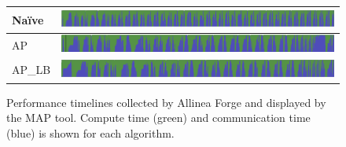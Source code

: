 \documentclass[11pt]{elsarticle}
\begin{document}
\begin{figure}[htp]
\centering
\label{my-label}
\begin{tabular}{|l|l|}
\hline
Na{\"i}ve & \includegraphics{naiveallinea} \\ \hline
AP & \includegraphics{apallinea} \\ \hline
AP\_LB & \includegraphics{aplballinea} \\ \hline
\end{tabular}
\caption{Performance timelines collected by Allinea Forge and displayed by the MAP tool. Compute time (green) and communication time (blue) is shown for each algorithm.}
\label{fig:allinea}
\end{figure}
\end{document}
